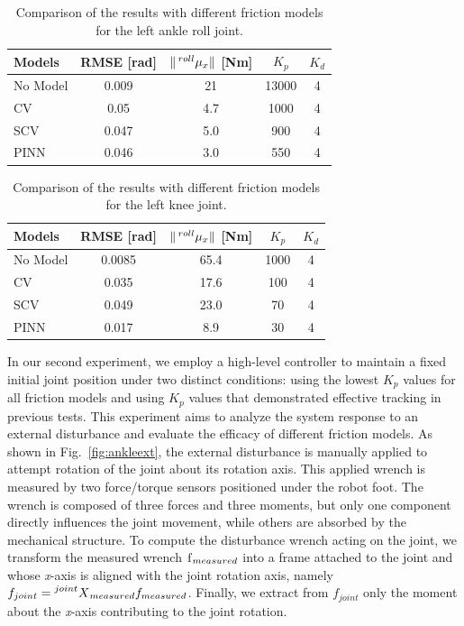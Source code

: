 \begin{table}[t]
\centering
\caption{Comparison of the results with different friction models for the left ankle roll joint.}
\setlength{\tabcolsep}{7pt}
\begin{tabular}{lcccc}
    \toprule
    Models    & RMSE [rad] & $\|\prescript{roll}{}{\mu_x}\|$ [Nm] & $K_p$ & $K_d$ \\
    \midrule
    No Model  & 0.009 & 21  & 13000 & 4 \\
    CV        & 0.05  & 4.7   & 1000 & 4 \\
    SCV       & 0.047 & 5.0   & 900 & 4  \\
    PINN      & 0.046 & 3.0   & 550 & 4  \\
    \bottomrule
\end{tabular}
\vspace{-12pt}
\label{tab:comparisonankle}
\end{table}
\begin{table}[t]
\centering
\caption{Comparison of the results with different friction models for the left knee joint.}
\setlength{\tabcolsep}{7pt}
\begin{tabular}{lcccc}
    \toprule
    Models    & RMSE [rad] & $\|\prescript{roll}{}{\mu_x}\|$ [Nm] & $K_p$ & $K_d$ \\
    \midrule
    No Model  & 0.0085 & 65.4  & 1000 & 4 \\
    CV        & 0.035  & 17.6   & 100 & 4 \\
    SCV       & 0.049 & 23.0   & 70 & 4  \\
    PINN      & 0.017 & 8.9   & 30 & 4  \\
    \bottomrule
\end{tabular}
\vspace{-20pt}
\label{tab:comparisonknee}
\end{table}
In our second experiment, we employ a high-level controller to maintain a fixed initial joint position under two distinct conditions: using the lowest $K_p$ values for all friction models and using $K_p$ values that demonstrated effective tracking in previous tests. This experiment aims to analyze the system response to an external disturbance and evaluate the efficacy of different friction models. As shown in Fig.~\ref{fig:ankleext}, the external disturbance is manually applied to attempt rotation of the joint about its rotation axis. This applied wrench is measured by two force/torque sensors positioned under the robot foot. The wrench is composed of three forces and three moments, but only one component directly influences the joint movement, while others are absorbed by the mechanical structure. To compute the disturbance wrench acting on the joint, we transform the measured wrench $\prescript{}{}{\mathrm{f}}_{measured}$ into a frame attached to the joint and whose \textit{x}-axis is aligned with the joint rotation axis, namely $f_{joint} = \prescript{joint}{}{X}_{measured} f_{measured}$. Finally, we extract from $f_{joint}$ only the moment about the \textit{x}-axis contributing to the joint rotation.

